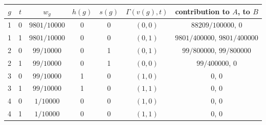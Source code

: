 \begin{tabular}{ccccccc}\toprule
$g$ & $t$ & $w_g$ & $h(g)$ & $s(g)$ & $\Gamma(v(g),t)$ & contribution to $A$, to $B$ \\\midrule
1 & 0 & $9801/10000$ & 0 & 0 & $(0,0)$ & $88209/100000$, $0$ \\
1 & 1 & $9801/10000$ & 0 & 0 & $(0,1)$ & $9801/400000$, $9801/400000$ \\
2 & 0 & $99/10000$ & 0 & 1 & $(0,1)$ & $99/800000$, $99/800000$ \\
2 & 1 & $99/10000$ & 0 & 1 & $(0,0)$ & $99/400000$, $0$ \\
3 & 0 & $99/10000$ & 1 & 0 & $(1,0)$ & $0$, $0$ \\
3 & 1 & $99/10000$ & 1 & 0 & $(1,1)$ & $0$, $0$ \\
4 & 0 & $1/10000$ & 0 & 0 & $(1,0)$ & $0$, $0$ \\
4 & 1 & $1/10000$ & 0 & 0 & $(1,1)$ & $0$, $0$ \\
\bottomrule\end{tabular}
